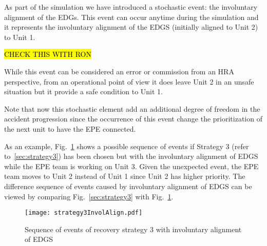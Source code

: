As part of the simulation we have introduced a stochastic event: the involuntary alignment of the EDGs.
This event can occur anytime during the simulation and it represents the involuntary alignment of the EDGS 
(initially aligned to Unit 2) to Unit 1. 

\hl{CHECK THIS WITH RON}

While this event can be considered an error or commission from an HRA perspective, from an operational point of view 
it does leave Unit 2 in an unsafe situation but it provide a safe condition to Unit 1. 

Note that now this stochastic element add an additional degree of freedom in the accident progression since the 
occurrence of this event change the prioritization of the next unit to have the EPE connected.

As an example, Fig.~\ref{fig:strategy3SchemeInvolAlign} shows a possible sequence of events if Strategy 3 
(refer to~\ref{sec:strategy3}) has been chosen but with the involuntary alignment of EDGS while the EPE team
is working on Unit 3. Given the unexpected event, the EPE team moves to Unit 2 instead of Unit 1 since Unit 2
has higher priority. The difference sequence of events caused by involuntary alignment of EDGS can be viewed
by comparing Fig.~\ref{sec:strategy3} with Fig.~\ref{fig:strategy3SchemeInvolAlign}.

\begin{figure}
    \centering
    \centerline{\texttt{[image: strategy3InvolAlign.pdf]}}
    \caption{Sequence of events of recovery strategy 3 with involuntary alignment of EDGS}
    \label{fig:strategy3SchemeInvolAlign}
\end{figure}

